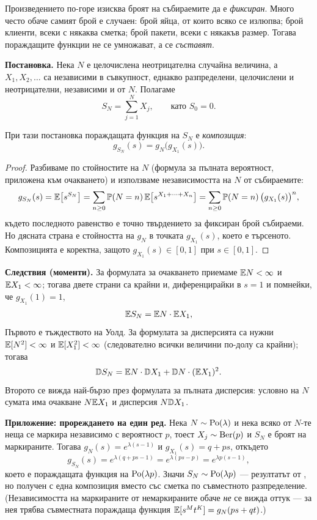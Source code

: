 \begin{supp}
Произведението\label{supp:random-sum} по-горе изисква броят на събираемите да е \emph{фиксиран}.
Много често обаче самият брой е случаен: брой яйца, от които всяко се излюпва; брой клиенти,
всеки с някаква сметка; брой пакети, всеки с някакъв размер. Тогава пораждащите функции не се
умножават, а се \emph{съставят}.

\textbf{Постановка.} Нека $N$ е целочислена неотрицателна случайна величина, а
$X_1, X_2, \dots$ са независими в съвкупност, еднакво разпределени, целочислени и
неотрицателни, независими и от $N$. Полагаме
\[
S_N = \sum_{j=1}^{N} X_j, \qquad\text{като } S_0 = 0 .
\]

\begin{prop}
При тази постановка пораждащата функция на $S_N$ е \emph{композиция}:
\[
g_{S_N}(s) = g_N\big(g_{X_1}(s)\big) .
\]
\end{prop}

\begin{proof}
Разбиваме по стойностите на $N$ (формула за пълната вероятност, приложена към очакването) и
използваме независимостта на $N$ от събираемите:
\[
g_{S_N}(s) = \mathbb{E}\big[s^{S_N}\big]
= \sum_{n \ge 0} \mathbb{P}(N = n)\, \mathbb{E}\big[s^{X_1 + \dots + X_n}\big]
= \sum_{n \ge 0} \mathbb{P}(N = n)\, \big(g_{X_1}(s)\big)^{n},
\]
където последното равенство е точно твърдението за фиксиран брой събираеми. Но дясната страна
е стойността на $g_N$ в точката $g_{X_1}(s)$, което е търсеното. Композицията е коректна,
защото $g_{X_1}(s) \in [0,1]$ при $s \in [0,1]$.
\end{proof}

\textbf{Следствия (моменти).} За формулата за очакването приемаме
$\mathbb{E} N<\infty$ и $\mathbb{E} X_1<\infty$; тогава двете страни са крайни и, диференцирайки
в $s=1$ и помнейки, че $g_{X_1}(1) = 1$,
\[
\mathbb{E} S_N = \mathbb{E} N \cdot \mathbb{E} X_1,
\]
Първото е тъждеството на Уолд. За формулата за дисперсията са нужни
$\mathbb{E}[N^2]<\infty$ и $\mathbb{E}[X_1^2]<\infty$ (следователно всички величини по-долу са
крайни); тогава
\[
\mathbb{D} S_N = \mathbb{E} N \cdot \mathbb{D} X_1 + \mathbb{D} N \cdot (\mathbb{E} X_1)^2 .
\]
Второто се вижда най-бързо през формулата за пълната дисперсия:
условно на $N$ сумата има очакване $N\mathbb{E} X_1$ и дисперсия $N\mathbb{D} X_1$.

\textbf{Приложение: прореждането на един ред.} Нека $N \sim \operatorname{Po}(\lambda)$ и нека всяко от
$N$-те неща се маркира независимо с вероятност $p$, тоест $X_j \sim \operatorname{Ber}(p)$ и
$S_N$ е броят на маркираните. Тогава $g_N(s) = e^{\lambda(s-1)}$ и $g_{X_1}(s) = q + ps$, откъдето
\[
g_{S_N}(s) = e^{\lambda(q + ps - 1)} = e^{\lambda(ps - p)} = e^{\lambda p (s-1)},
\]
което е пораждащата функция на $\operatorname{Po}(\lambda p)$. Значи $S_N \sim \operatorname{Po}(\lambda p)$ — резултатът от
, но получен с една композиция
вместо със сметка по съвместното разпределение. (Независимостта на маркираните от
немаркираните обаче \emph{не} се вижда оттук — за нея трябва съвместната пораждаща функция
$\mathbb{E}[s^{M}t^{K}] = g_N(ps+qt)$.)
\end{supp}


